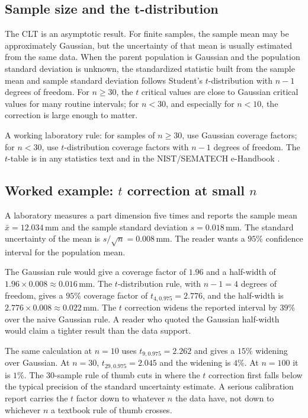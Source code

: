 \subsection{Sample size and the t-distribution}

The CLT is an asymptotic result. For finite samples, the sample
mean may be approximately Gaussian, but the uncertainty of that
mean is usually estimated from the same data. When the parent
population is Gaussian and the population standard deviation is
unknown, the standardized statistic built from the sample mean and
sample standard deviation follows Student's $t$-distribution with
$n - 1$ degrees of freedom. For $n \geq 30$, the $t$ critical values
are close to Gaussian critical values for many routine intervals;
for $n < 30$, and especially for $n < 10$, the correction is large
enough to matter.

A working laboratory rule: for samples of $n \geq 30$, use Gaussian
coverage factors; for $n < 30$, use $t$-distribution coverage
factors with $n - 1$ degrees of freedom. The $t$-table is in any
statistics text and in the NIST/SEMATECH e-Handbook
\cite{web:nist-eshandbook}.

\subsection{Worked example: $t$ correction at small $n$}

A laboratory measures a part dimension five times and reports the
sample mean $\bar{x} = 12.034\,\si{\milli\meter}$ and the sample
standard deviation $s = 0.018\,\si{\milli\meter}$. The standard
uncertainty of the mean is $s/\sqrt{n} = 0.008\,\si{\milli\meter}$.
The reader wants a $95\%$ confidence interval for the population
mean.

The Gaussian rule would give a coverage factor of $1.96$ and a
half-width of $1.96 \times 0.008 \approx 0.016\,\si{\milli\meter}$.
The $t$-distribution rule, with $n - 1 = 4$ degrees of freedom,
gives a $95\%$ coverage factor of $t_{4, 0.975} = 2.776$, and the
half-width is $2.776 \times 0.008 \approx 0.022\,\si{\milli\meter}$.
The $t$ correction widens the reported interval by $39\%$ over the
naive Gaussian rule. A reader who quoted the Gaussian half-width
would claim a tighter result than the data support.

The same calculation at $n = 10$ uses $t_{9, 0.975} = 2.262$ and
gives a $15\%$ widening over Gaussian. At $n = 30$, $t_{29, 0.975}
= 2.045$ and the widening is $4\%$. At $n = 100$ it is $1\%$. The
$30$-sample rule of thumb cuts in where the $t$ correction first
falls below the typical precision of the standard uncertainty
estimate. A serious calibration report carries the $t$ factor down
to whatever $n$ the data have, not down to whichever $n$ a textbook
rule of thumb crosses.

